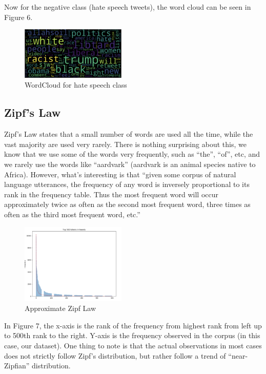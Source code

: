 \documentclass{article}
\begin{document}
	Now for the negative class (hate speech tweets), the word cloud can be seen in Figure 6.
	
	\begin{figure}[h]
		\label{Figure 6}
		\caption{WordCloud for hate speech class}
		\includegraphics[width=50mm]{wordneg.png}
		\centering
	\end{figure}
	
	\subsection{Zipf's Law}
	
	Zipf’s Law states that a small number of words are used all the time, while the vast majority are used very rarely. There is nothing surprising about this, we know that we use some of the words very frequently, such as “the”, “of”, etc, and we rarely use the words like “aardvark” (aardvark is an animal species native to Africa). However, what’s interesting is that “given some corpus of natural language utterances, the frequency of any word is inversely proportional to its rank in the frequency table. Thus the most frequent word will occur approximately twice as often as the second most frequent word, three times as often as the third most frequent word, etc.”
	
	\begin{figure}[h]
		\label{Figure 7}
		\caption{Approximate Zipf Law}
		\includegraphics[width=50mm]{zipf.png}
		\centering
	\end{figure}
	
	
	In Figure 7, the x-axis is the rank of the frequency from highest rank from left up to 500th rank to the right. Y-axis is the frequency observed in the corpus (in this case, our dataset). One thing to note is that the actual observations in most cases does not strictly follow Zipf’s distribution, but rather follow a trend of “near-Zipfian” distribution.
	
\end{document}
